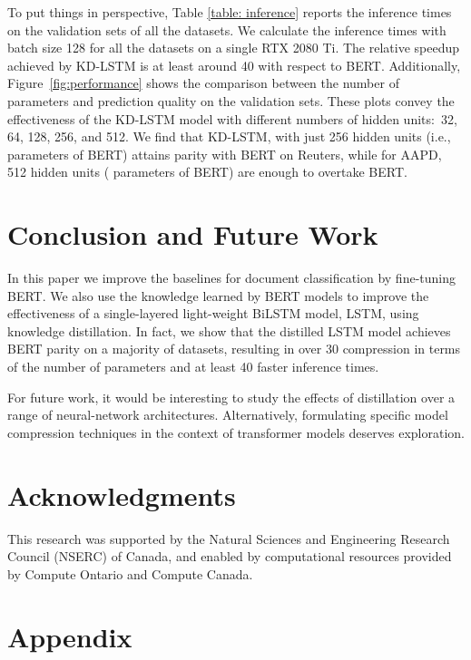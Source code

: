 \documentclass[11pt,a4paper]{article}
\newcommand{\BLSTMR}[1]{LSTM}
\newcommand{\BERTB}[1]{BERT}
\begin{document}
To put things in perspective, Table \ref{table: inference} reports the inference times on the validation sets of all the datasets.
We calculate the inference times with batch size 128 for all the datasets on a single RTX 2080 Ti.
The relative speedup achieved by KD-\BLSTMR{} is at least around 40 with respect to \BERTB{}.
Additionally, Figure~\ref{fig:performance} shows the comparison between the number of parameters and prediction quality on the validation sets.
These plots convey the effectiveness of the KD-\BLSTMR{} model with different numbers of hidden units:\ 32, 64, 128, 256, and 512.
We find that KD-\BLSTMR{}, with just 256 hidden units (i.e.,  parameters of \BERTB{}) attains parity with \BERTB{} on Reuters, while for AAPD, 512 hidden units ( parameters of \BERTB{}) are enough to overtake \BERTB{}.


\section{Conclusion and Future Work}

In this paper we improve the baselines for document classification by fine-tuning BERT.
We also use the knowledge learned by BERT models to improve the effectiveness of a single-layered light-weight BiLSTM model, \BLSTMR{}, using knowledge distillation.
In fact, we show that the distilled \BLSTMR{} model achieves \BERTB{} parity on a majority of datasets, resulting in over 30 compression in terms of the number of parameters and at least 40 faster inference times.

For future work, it would be interesting to study the effects of distillation over a range of neural-network architectures.
Alternatively, formulating specific model compression techniques in the context of transformer models deserves exploration.

\section*{Acknowledgments}

This research was supported by the Natural Sciences and Engineering Research Council (NSERC) of Canada, and enabled by computational resources provided by Compute Ontario and Compute Canada.




\clearpage

\appendix

\section{Appendix} \label{appendix}
\end{document}
